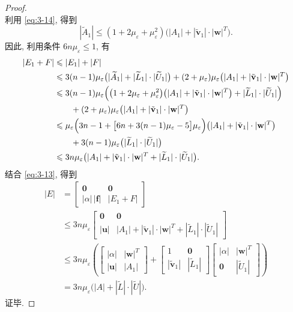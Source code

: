 \begin{proof}
\[\]
利用 \eqref{eq:3-14}, 得到
\[
  |\widetilde{A}_1|\leqslant(1+2\mu_\varepsilon+\mu_\varepsilon^2)
  \bigl(|A_1|+|\tilde{\mathbf{v}}_1|\cdot|\mathbf{w}|^T\bigr).
\]
因此, 利用条件 $6n\mu_\varepsilon\leqslant1$, 有
\[
  \begin{aligned}
    |E_1+F|
    &\leqslant|E_1|+|F|\\
    &\leqslant3(n-1)\mu_\varepsilon\bigl(|\widetilde{A}_1|+|\widetilde{L}_1|\cdot|\widetilde{U}_1|\bigr)
      +(2+\mu_\varepsilon)\mu_\varepsilon\bigl(|A_1|+|\tilde{\mathbf{v}}_1|\cdot|\mathbf{w}|^T\bigr)\\
    &\leqslant3(n-1)\mu_\varepsilon\Bigl(\bigl(1+2\mu_\varepsilon+\mu_\varepsilon^2\bigr)
      \bigl(|A_1|+|\tilde{\mathbf{v}}_1|\cdot|\mathbf{w}|^T\bigr)
      +|\widetilde{L}_1|\cdot|\widetilde{U}_1|\Bigr)\\
    &\qquad+(2+\mu_\varepsilon)\mu_\varepsilon\bigl(|A_1|+|\tilde{\mathbf{v}}_1|\cdot|\mathbf{w}|^T\bigr)\\
    &\leqslant\mu_\varepsilon\Bigl(3n-1+\bigl[6n+3(n-1)\mu_\varepsilon-5\bigr]\mu_\varepsilon\Bigr)
      \bigl(|A_1|+|\tilde{\mathbf{v}}_1|\cdot|\mathbf{w}|^T\bigr)\\
    &\qquad+3(n-1)\mu_\varepsilon\bigl(|\widetilde{L}_1|\cdot|\widetilde{U}_1|\bigr)\\
    &\leqslant3n\mu_\varepsilon\bigl(|A_1|+|\tilde{\mathbf{v}}_1|\cdot|\mathbf{w}|^T
      +|\widetilde{L}_1|\cdot|\widetilde{U}_1|\bigr).
  \end{aligned}
\]
结合 \eqref{eq:3-13}, 得到
\[
  \begin{aligned}
    |E|
    &=
    \begin{bmatrix}
      \mathbf{0} & \mathbf{0}\\
      |\alpha|\,|\mathbf{f}| & |E_1+F|
    \end{bmatrix}\\
    &\leqslant3n\mu_\varepsilon
    \begin{bmatrix}
      \mathbf{0} & \mathbf{0}\\
      |\mathbf{u}| & |A_1|+|\tilde{\mathbf{v}}_1|\cdot|\mathbf{w}|^T
        +|\widetilde{L}_1|\cdot|\widetilde{U}_1|
    \end{bmatrix}\\
    &\leqslant3n\mu_\varepsilon\left(
    \begin{bmatrix}
      |\alpha| & |\mathbf{w}|^T\\
      |\mathbf{u}| & |A_1|
    \end{bmatrix}
    +
    \begin{bmatrix}
      1 & \mathbf{0}\\
      |\tilde{\mathbf{v}}_1| & |\widetilde{L}_1|
    \end{bmatrix}
    \begin{bmatrix}
      |\alpha| & |\mathbf{w}|^T\\
      \mathbf{0} & |\widetilde{U}_1|
    \end{bmatrix}\right)\\
    &=3n\mu_\varepsilon\bigl(|A|+|\widetilde{L}|\cdot|\widetilde{U}|\bigr).
  \end{aligned}
\]
证毕.
\end{proof}

